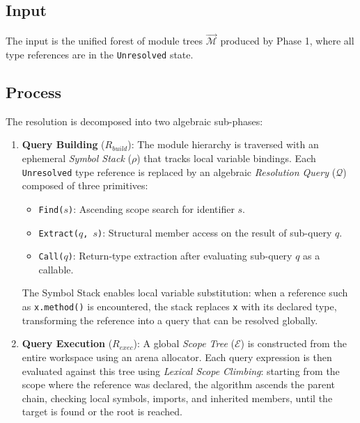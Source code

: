 \subsection{Input}

The input is the unified forest of module trees $\vec{\mathcal{M}}$
produced by Phase 1, where all type references are in the
\texttt{Unresolved} state.

\subsection{Process}

The resolution is decomposed into two algebraic sub-phases:

\begin{enumerate}
  \item \textbf{Query Building} ($R_{build}$): The module hierarchy
    is traversed with an ephemeral \textit{Symbol Stack} ($\rho$)
    that tracks local variable bindings. Each \texttt{Unresolved}
    type reference is replaced by an algebraic \textit{Resolution
    Query} ($\mathcal{Q}$) composed of three primitives:
    \begin{itemize}
      \item \texttt{Find($s$)}: Ascending scope search for identifier $s$.
      \item \texttt{Extract($q$, $s$)}: Structural member access on
        the result of sub-query $q$.
      \item \texttt{Call($q$)}: Return-type extraction after
        evaluating sub-query $q$ as a callable.
    \end{itemize}
    The Symbol Stack enables local variable substitution: when a
    reference such as \texttt{x.method()} is encountered, the stack
    replaces \texttt{x} with its declared type, transforming the
    reference into a query that can be resolved globally.

  \item \textbf{Query Execution} ($R_{exec}$): A global \textit{Scope
    Tree} ($\mathcal{E}$) is constructed from the entire workspace
    using an arena allocator. Each query expression is then evaluated
    against this tree using \textit{Lexical Scope Climbing}: starting
    from the scope where the reference was declared, the algorithm
    ascends the parent chain, checking local symbols, imports, and
    inherited members, until the target is found or the root is reached.
\end{enumerate}

